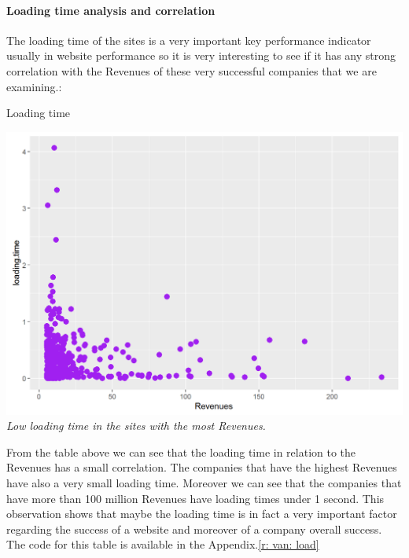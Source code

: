 \documentclass{article}
\begin{document}
\paragraph{Loading time analysis and correlation}
The loading time of the sites is a very important key performance indicator usually in website performance so it is very interesting to see if it has any strong correlation with the Revenues of these very successful companies that we are examining.:
\begin{table}[H]
\centering
\caption{Loading time}
\begin{center}
\includegraphics[scale=0.5]{../R/photos/31_ld_rev.png}  \\
\textit{Low loading time in the sites with the most Revenues.}
\end{center}
\end{table}
From the table above we can see that the loading time in relation to the Revenues has a small correlation. The companies that have the highest Revenues have also a very small loading time. Moreover we can see that the companies that have more than 100 million Revenues have loading times under 1 second. This observation shows that maybe the loading time is in fact a very important factor regarding the success of a website and moreover of a company overall success. The code for this table is available in the Appendix.\ref{r: van: load}
\end{document}
